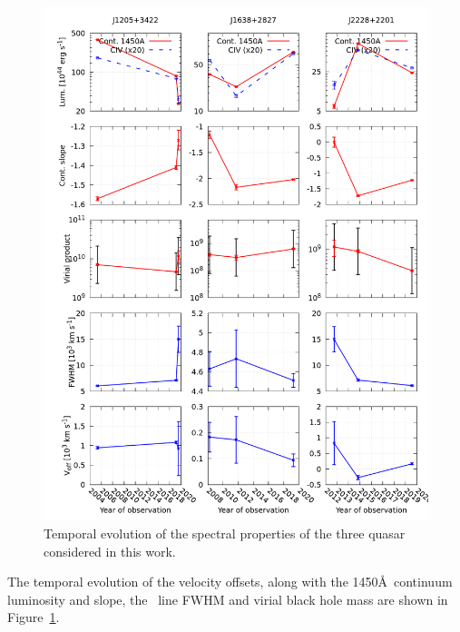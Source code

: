 \documentclass[fleqn,usenatbib]{mnras}
\begin{document}
\begin{figure}
  \centering
  \includegraphics[width=\textwidth]{figures/QSFit-results}
  \vspace{-12pt}
  \caption{Temporal evolution of the spectral properties of the three
    quasar considered in this work.}
  \label{fig:QSFit-results}
\end{figure}
The temporal evolution of the velocity offsets, along with the
1450\AA\ continuum luminosity and slope, the \civ\ line FWHM
and virial black hole mass are shown in Figure~\ref{fig:QSFit-results}.
\end{document}
